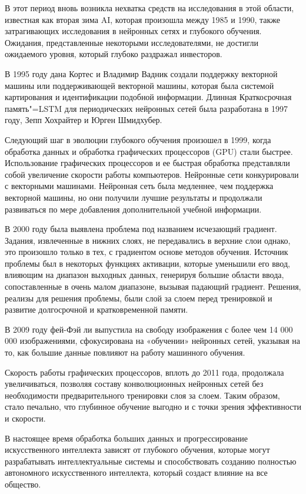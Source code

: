  В этот период вновь возникла нехватка средств на исследования в этой области, известная как вторая зима AI,
 которая произошла между 1985 и 1990, также затрагивающих исследования в нейронных сетях и глубокого обучения.
 Ожидания, представленные некоторыми исследователями, не достигли ожидаемого уровня, который глубоко раздражал инвесторов. 

 В 1995 году дана Кортес и Владимир Вадник создали поддержку векторной машины или поддерживающей векторной машины, 
 которая была системой картирования и идентификации подобной информации. 
 Длинная Краткосрочная память"=LSTM для периодических нейронных сетей была разработана в 1997 году, 
 Зепп Хохрайтер и Юрген Шмидхубер.

 Следующий шаг в эволюции глубокого обучения произошел в 1999,
 когда обработка данных и обработка графических процессоров (GPU) стали быстрее. 
 Использование графических процессоров и ее быстрая обработка представляли собой увеличение скорости работы компьютеров.
 Нейронные сети конкурировали с векторными машинами. Нейронная сеть была медленнее, 
 чем поддержка векторной машины, но они получили лучшие результаты и продолжали развиваться 
 по мере добавления дополнительной учебной информации. 

 В 2000 году была выявлена проблема под названием исчезающий градиент. 
 Задания, извлеченные в нижних слоях, не передавались в верхние слои однако,
 это произошло только в тех, с градиентом основе методов обучения. 
 Источник проблемы был в некоторых функциях активации, которые уменьшили его ввод,
 влияющим на диапазон выходных данных, генерируя большие области ввода,
 сопоставленные в очень малом диапазоне, вызывая падающий градиент. 
 Решения, реализы для решения проблемы, были слой за слоем перед 
 тренировкой и развитие долгосрочной и кратковременной памяти.

 В 2009 году фей-Фэй ли выпустила на свободу изображения
 с более чем 14 000 000 изображениями,
 сфокусирована на «обучении» нейронных сетей, указывая на то, 
 как большие данные повлияют на работу машинного обучения. 

 Скорость работы графических процессоров, вплоть до 2011 года, 
 продолжала увеличиваться, позволяя составу конволюционных нейронных 
 сетей без необходимости предварительного тренировки слоя за слоем. 
 Таким образом, стало печально, что глубинное обучение выгодно и
 с точки зрения эффективности и скорости. 

 В настоящее время обработка больших данных и прогрессирование искусственного интеллекта зависят от глубокого обучения, 
 которые могут разрабатывать интеллектуальные системы и способствовать созданию полностью автономного искусственного интеллекта, 
 который создаст влияние на все общество.